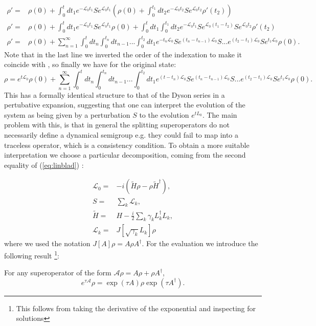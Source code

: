 \begin{equation}
\begin{split}
\rho' =& \rho(0) +  \int_{0}^{t}dt_{1} e^{-\mathcal{L}_{0}t_{1}}Se^{\mathcal{L}_{0}t_{1}}\left(\rho(0) + \int_{0}^{t_{1}}dt_{2} e^{-\mathcal{L}_{0}t_{2}}Se^{\mathcal{L}_{0}t_{2}}\rho'(t_{2}) \right)\\
  \rho' =& \rho(0) +  \int_{0}^{t}dt_{1} e^{-\mathcal{L}_{0}t_{1}}Se^{\mathcal{L}_{0}t_{1}}\rho(0) + \int_{0}^{t}dt_{1} \int_{0}^{t_{1}}dt_{2}e^{-\mathcal{L}_{0}t_{1}}Se^{\mathcal{L}_{0}(t_{1}-t_{2})}Se^{\mathcal{L}_{0}t_{2}}\rho'(t_{2})\\
  \rho' =& \rho(0) + \sum_{n=1}^{\infty}\int_{0}^{t}dt_{n}\int_{0}^{t_{n}}dt_{n-1}...\int_{0}^{t_{2}}dt_{1}e^{-t_{n}\mathcal{L}_{0}}Se^{(t_{n}-t_{n-1})\mathcal{L}_{0}}S...e^{(t_{2}-t_{1})\mathcal{L}_{0}}Se^{t_{1}\mathcal{L}_{0}}\rho(0).
\end{split}
\end{equation}
Note that in the last line we inverted the order of the indexation to make it coincide with \cite{hornberger2009introduction}, so finally
we have for the original state:
\begin{equation}\label{eq:unraveling}
  \rho = e^{t\mathcal{L}_{0}}\rho(0) + \sum_{n=1}^{\infty}\int_{0}^{t}dt_{n}\int_{0}^{t_{n}}dt_{n-1}...\int_{0}^{t_{2}}dt_{1}e^{(t-t_{n})\mathcal{L}_{0}}Se^{(t_{n}-t_{n-1})\mathcal{L}_{0}}S...e^{(t_{2}-t_{1})\mathcal{L}_{0}}Se^{t_{1}\mathcal{L}_{0}}\rho(0).
\end{equation}
This has a formally identical structure to that of the Dyson series in a pertubative expansion, suggesting that one can interpret the evolution
of the system as being given by a perturbation $S$ to the evolution $e^{t{L}_{0}}$. The main problem with this, is that in general the splitting
superoperators do not necessarily define a dynamical semigroup e.g. they could fail to map into a traceless operator, which is a consistency
condition. To obtain a more suitable interpretation we choose a particular decomposition, coming from the second equality of (\ref{eq:linblad})
\cite{hornberger2009introduction}:

\begin{align}
\mathcal{L}_{0} =& -i(\tilde{H}\rho - \rho\tilde{H}^{\dagger}),\\
S =& \sum_{k}\mathcal{L}_{k},\\
  \tilde{H} =& H - \frac{i}{2}\sum_{k}\gamma_{k}L_{k}^{\dagger}L_{k},\\
  \mathcal{L}_{k} = & J[\sqrt{\gamma_{k}}L_{k}]\rho\,
\end{align}
where we used the notation $J[A]\rho = A\rho A^{\dagger}$.
For the evaluation we introduce the following result \footnote{This follows from taking the derivative of the exponential and inspecting for solutions}:
\begin{lemma}
  For any superoperator of the form $\mathcal{A}\rho = A\rho+\rho A^{\dagger}$,
  \begin{equation}
    e^{\tau\mathcal{A}}\rho=\exp(\tau A)\rho\exp(\tau A^{\dagger}).
  \end{equation}
\end{lemma}

